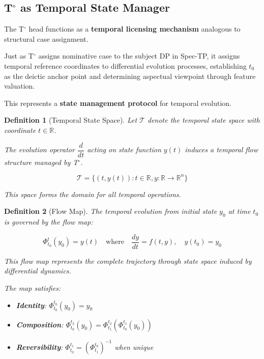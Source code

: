\documentclass[11pt]{article}
\theoremstyle{defstyle}
\newtheorem{definition}{Definition}[section]
\theoremstyle{mapstyle}
\newenvironment{keyinsight}
{\begin{tcolorbox}[
  enhanced,
  colback=keybox,
  colframe=headerblue,
  boxrule=1.2pt,
  arc=4pt,
  left=10pt,right=10pt,top=10pt,bottom=10pt,
  before skip=12pt,after skip=12pt
]}
{\end{tcolorbox}}
\begin{document}
\subsection{T$^\circ$ as Temporal State Manager}

\begin{keyinsight}
The T$^\circ$ head functions as a \textbf{temporal licensing mechanism} analogous to structural case assignment. 

Just as T$^\circ$ assigns nominative case to the subject DP in Spec-TP, it assigns temporal reference coordinates to differential evolution processes, establishing $t_0$ as the deictic anchor point and determining aspectual viewpoint through feature valuation.

This represents a \textbf{state management protocol} for temporal evolution.
\end{keyinsight}

\begin{definition}[Temporal State Space]
Let $\mathcal{T}$ denote the temporal state space with coordinate $t \in \mathbb{R}$. 

The evolution operator $\dfrac{d}{dt}$ acting on state function $y(t)$ induces a temporal flow structure managed by T$^\circ$.

\[
\mathcal{T} = \{(t, y(t)) : t \in \mathbb{R}, y: \mathbb{R} \to \mathbb{R}^n\}
\]

This space forms the domain for all temporal operations.
\end{definition}

\begin{definition}[Flow Map]
The temporal evolution from initial state $y_0$ at time $t_0$ is governed by the flow map:

\[
\Phi_{t_0}^t(y_0) = y(t) \quad \text{where} \quad \frac{dy}{dt} = f(t, y), \quad y(t_0) = y_0
\]

This flow map represents the complete trajectory through state space induced by differential dynamics.

The map satisfies:
\begin{itemize}
\item \textbf{Identity}: $\Phi_{t_0}^{t_0}(y_0) = y_0$
\item \textbf{Composition}: $\Phi_{t_0}^{t_2}(y_0) = \Phi_{t_1}^{t_2}(\Phi_{t_0}^{t_1}(y_0))$
\item \textbf{Reversibility}: $\Phi_{t_0}^{t_1} = (\Phi_{t_1}^{t_0})^{-1}$ when unique
\end{itemize}
\end{definition}
\end{document}

